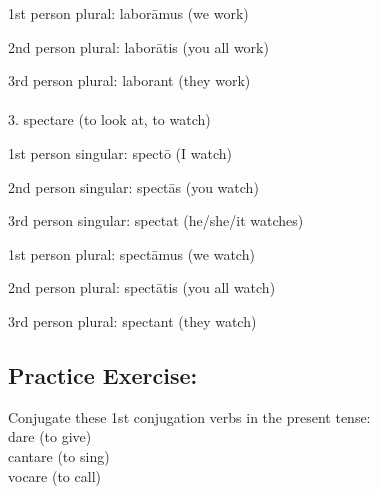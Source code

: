     1st person plural: laborāmus (we work)

    2nd person plural: laborātis (you all work)

    3rd person plural: laborant (they work) \\\\
3. spectare (to look at, to watch)

    1st person singular: spectō (I watch)

    2nd person singular: spectās (you watch)

    3rd person singular: spectat (he/she/it watches)

    1st person plural: spectāmus (we watch)

    2nd person plural: spectātis (you all watch)

    3rd person plural: spectant (they watch)
\subsection*{Practice Exercise:}
Conjugate these 1st conjugation verbs in the present tense: \\
dare (to give) \\ 
cantare (to sing) \\ 
vocare (to call) \\

